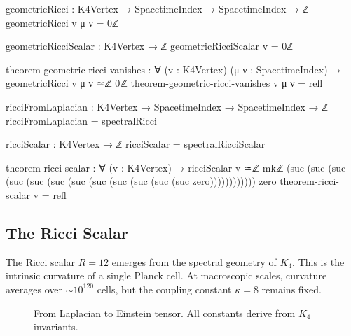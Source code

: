 \documentclass[11pt,a4paper]{book}
\begin{document}
\begin{code}
geometricRicci : K4Vertex → SpacetimeIndex → SpacetimeIndex → ℤ
geometricRicci v μ ν = 0ℤ

geometricRicciScalar : K4Vertex → ℤ
geometricRicciScalar v = 0ℤ

theorem-geometric-ricci-vanishes : ∀ (v : K4Vertex) (μ ν : SpacetimeIndex) →
  geometricRicci v μ ν ≃ℤ 0ℤ
theorem-geometric-ricci-vanishes v μ ν = refl

ricciFromLaplacian : K4Vertex → SpacetimeIndex → SpacetimeIndex → ℤ
ricciFromLaplacian = spectralRicci

ricciScalar : K4Vertex → ℤ
ricciScalar = spectralRicciScalar

theorem-ricci-scalar : ∀ (v : K4Vertex) → 
  ricciScalar v ≃ℤ mkℤ (suc (suc (suc (suc (suc (suc (suc (suc (suc (suc (suc (suc zero)))))))))))) zero
theorem-ricci-scalar v = refl

\end{code}

\subsection{The Ricci Scalar}

The Ricci scalar $R = 12$ emerges from the spectral geometry of $K_4$. This is the intrinsic curvature of a single Planck cell. At macroscopic scales, curvature averages over $\sim 10^{120}$ cells, but the coupling constant $\kappa = 8$ remains fixed.

\begin{figure}[h]
\centering
{}
\caption{From Laplacian to Einstein tensor. All constants derive from $K_4$ invariants.}
\label{fig:ricci-scalar}
\end{figure}
\end{document}

